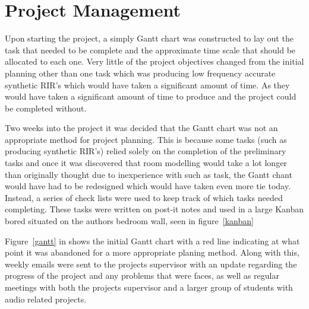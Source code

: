\documentclass[../../main.tex]{subfiles}
\begin{document}
\section{Project Management}
	Upon starting the project, a simply Gantt chart was constructed to lay out the task that needed to be complete and the approximate time scale that should be allocated to each one. Very little of the project objectives changed from the initial planning other than one task which was producing low frequency accurate synthetic \ac{RIR}'s which would have taken a significant amount of time. As they would have taken a significant amount of time to produce and the project could be completed without.

	Two weeks into the project it was decided that the Gantt chart was not an appropriate method for project planning. This is because some tasks (such as producing synthetic \ac{RIR}'s) relied solely on the completion of the preliminary tasks and once it was discovered that room modelling would take a lot longer than originally thought due to inexperience with such as task, the Gantt chant would have had to be redesigned which would have taken even more tie today. Instead, a series of check lists were used to keep track of which tasks needed completing. These tasks were written on post-it notes and used in a large Kanban bored situated on the authors bedroom wall, seen in figure~\ref{kanban}

	Figure~\ref{gantt} in  shows the initial Gantt chart with a red line indicating at what point it was abandoned for a more appropriate planing method. Along with this, weekly emails were sent to the projects supervisor with an update regarding the progress of the project and any problems that were faces, as well as regular meetings with both the projects supervisor and a larger group of students with audio related projects.
\end{document}

